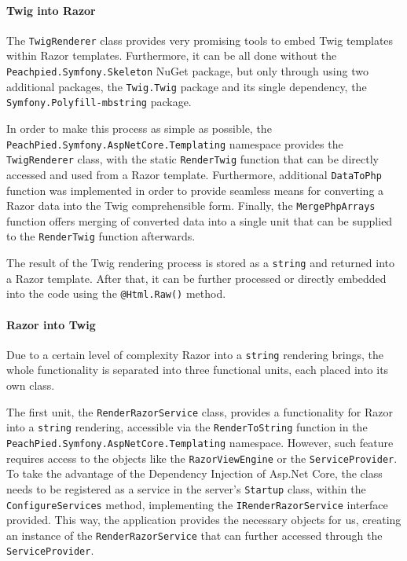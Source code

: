 \paragraph{Twig into Razor} The \texttt{TwigRenderer} class provides very promising tools to embed Twig templates within Razor templates. Furthermore, it can be all done without the \texttt{Peachpied.Symfony.Skeleton} NuGet package, but only through using two additional packages, the \texttt{Twig.Twig} package and its single dependency, the \texttt{Symfony.Polyfill-mbstring} package.

In order to make this process as simple as possible, the \texttt{PeachPied.Symfony.AspNetCore.Templating} namespace provides the \texttt{TwigRenderer} class, with the static \texttt{RenderTwig} function that can be directly accessed and used from a Razor template. Furthermore, additional \texttt{DataToPhp} function was implemented in order to provide seamless means for converting a Razor data into the Twig comprehensible form. Finally, the \texttt{MergePhpArrays} function offers merging of converted data into a single unit that can be supplied to the \texttt{RenderTwig} function afterwards.

The result of the Twig rendering process is stored as a \texttt{string} and returned into a Razor template. After that, it can be further processed or directly embedded into the code using the \texttt{@Html.Raw()} method.


\paragraph{Razor into Twig} Due to a certain level of complexity Razor into a \texttt{string} rendering brings, the whole functionality is separated into three functional units, each placed into its own class. 

The first unit, the \texttt{RenderRazorService} class, provides a functionality for Razor into a \texttt{string} rendering, accessible via the \texttt{RenderToString} function in the \texttt{PeachPied.Symfony.AspNetCore.Templating} namespace. However, such feature requires access to the objects like the \texttt{RazorViewEngine} or the \texttt{ServiceProvider}. To take the advantage of the Dependency Injection of Asp.Net Core, the class needs to be registered as a service in the server's \texttt{Startup} class, within the \texttt{ConfigureServices} method, implementing the \texttt{IRenderRazorService} interface provided. This way, the application provides the necessary objects for us, creating an instance of the \texttt{RenderRazorService} that can further accessed through the \texttt{ServiceProvider}.

